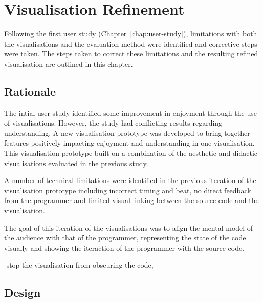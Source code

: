
\chapter{Visualisation Refinement}
\label{chap:visualisation-refinement}

Following the first user study (Chapter~\ref{chap:user-study}), limitations with both the visualisations and the evaluation method were identified and corrective steps were taken. The steps taken to correct these limitations and the resulting refined visualisation are outlined in this chapter.

\section{Rationale}

The intial user study identified some improvement in enjoyment through the use of visualisations. However, the study had conflicting results regarding understanding. A new visualisation prototype was developed to bring together features positively impacting enjoyment and understanding in one visualisation. This visualisation prototype built on a combination of the aesthetic and didactic visualisations evaluated in the previous study.



A number of technical limitations were identified in the previous iteration of the visualisation prototype including incorrect timing and beat, no direct feedback from the programmer and limited visual linking between the source code and the visualisation.

The goal of this iteration of the visualisations was to align the mental model of the audience with that of the programmer, representing the state of the code visually and showing the iteraction of the programmer with the source code.



-stop the visualisation from obscuring the code, 


\section{Design}

